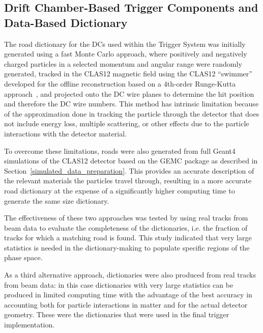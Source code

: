 \subsection{Drift Chamber-Based Trigger Components and Data-Based Dictionary}
\label{dc_dictionary}

The road dictionary for the DCs used within the Trigger System was initially generated using a fast Monte
Carlo approach, where positively and negatively charged particles in a selected momentum and angular range
were randomly generated, tracked in the CLAS12 magnetic field using the CLAS12 ``swimmer'' developed
for the offline reconstruction based on a 4th-order Runge-Kutta approach~\cite{offline-ref}, and projected
onto the DC wire planes to determine the hit position and therefore the DC wire numbers. This method has
intrinsic limitation because of the approximation done in tracking the particle through the detector that does
not include energy loss, multiple scattering, or other effects due to the particle interactions with the detector
material.

To overcome these limitations, roads were also generated from full Geant4 simulations of the CLAS12
detector based on the GEMC package as described in Section~\ref{simulated_data_preparation}. This provides
an accurate description of the relevant materials the particles travel through, resulting in a more accurate
road dictionary at the expense of a significantly higher computing time to generate the same size dictionary.

The effectiveness of these two approaches was tested by using real tracks from beam data to evaluate the
completeness of the dictionaries, i.e. the fraction of tracks for which a matching road is found. This study
indicated that very large statistics is needed in the dictionary-making to populate specific regions of the
phase space.

As a third alternative approach, dictionaries were also produced from real tracks from beam data: in this
case dictionaries with very large statistics can be produced in limited computing time with the advantage of
the best accuracy in accounting both for particle interactions in matter and for the actual detector geometry.
These were the dictionaries that were used in the final trigger implementation.

